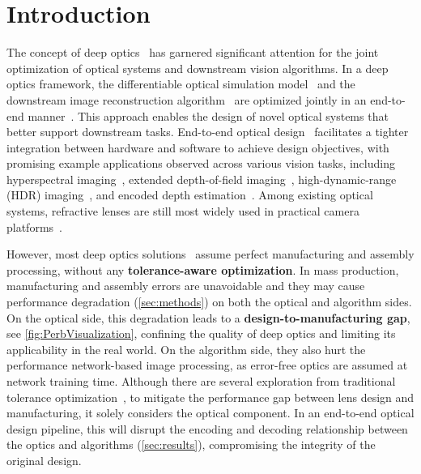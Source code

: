 \section{Introduction}
\label{sec:intro}
The concept of deep optics~\cite{yang2024curriculum, Sitzmann_2018, sun2021end} has garnered significant attention for the joint optimization of optical systems and downstream vision algorithms. In a deep optics framework, the differentiable optical simulation model~\cite{sitzmann2018end, yang2024curriculum, sun2021end} and the downstream image reconstruction algorithm~\cite{sun2020learning, klotz2025minimalist} are optimized jointly in an end-to-end manner~\cite{li2021end, sun2021end}. This approach enables the design of novel optical systems that better support downstream tasks. End-to-end optical design~\cite{sitzmann2018end, peng2019learned, cai2024phocolens, yang2024curriculum,sun2021end} facilitates a tighter integration between hardware and software to achieve design objectives, with promising example applications observed across various vision tasks, including hyperspectral imaging~\cite{li2022quantization}, extended depth-of-field imaging~\cite{yang2024curriculum}, high-dynamic-range (HDR) imaging~\cite{sun2020learning, metzler2020deep}, and encoded depth estimation~\cite{yang2023aberration, ikoma2021depth}. Among existing optical systems, refractive lenses are still most widely used in practical camera platforms~\cite{wang2022differentiable, cote2023differentiable, peng2019learned, li2021end, zhang2023large}.

However, most deep optics solutions~\cite{yang2023aberration, chang2019deep, sun2020learning} assume perfect manufacturing and assembly processing, without any \textbf{tolerance-aware optimization}. In mass production, manufacturing and assembly errors are unavoidable and they may cause performance degradation (\cref{sec:methods}) on both the optical and algorithm sides. On the optical side, this degradation leads to a \textbf{design-to-manufacturing gap}, see \cref{fig:PerbVisualization}, confining the quality of deep optics and limiting its applicability in the real world. On the algorithm side, they also hurt the performance network-based image processing, as error-free optics are assumed at network training time. Although there are several exploration from traditional tolerance optimization~\cite{oinen1990new, forse1996statistical, hu2015design}, to mitigate the performance gap between lens design and manufacturing, it solely considers the optical component. In an end-to-end optical design pipeline, this will disrupt the encoding and decoding relationship between the optics and algorithms (\cref{sec:results}), compromising the integrity of the original design. 

